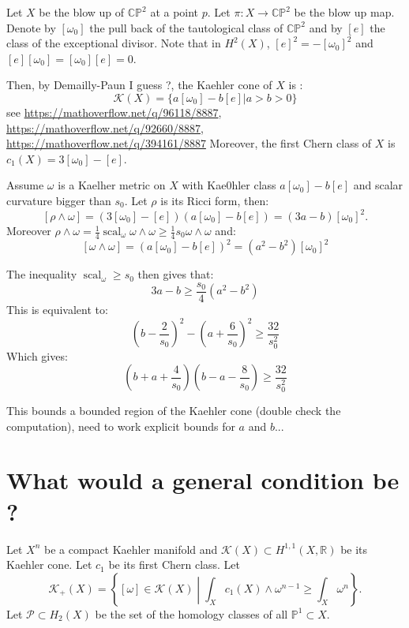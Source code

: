 \documentclass{amsart}
\numberwithin{equation}{section}
\theoremstyle {definition}
\DeclareMathOperator{\scal}{scal}
\begin{document}
Let $X$ be the blow up of $\mathbb{CP}^2$ at a point $p$. Let $\pi:X\to\mathbb{CP}^2$ be the blow up map. Denote by $[\omega_0]$ the pull back of the tautological class of $\mathbb{CP}^2$ and by $[e]$ the class of the exceptional divisor. Note that in $H^2(X)$, $[e]^2=-[\omega_0]^2$ and $[e][\omega_0]=[\omega_0][e]=0$.

Then, by Demailly-Paun I guess ?, the Kaehler cone of $X$ is :
\[\mathcal{K}(X)=\{a[\omega_0]-b[e]|a>b>0\}\]
see \url{https://mathoverflow.net/q/96118/8887}, \url{https://mathoverflow.net/q/92660/8887}, \url{https://mathoverflow.net/q/394161/8887}
Moreover, the first Chern class of $X$ is $c_1(X)=3[\omega_0]-[e]$.

Assume $\omega$ is a Kaelher metric on $X$ with Kae0hler class $a[\omega_0]-b[e]$ and scalar curvature bigger than $s_0$. Let $\rho$ is its Ricci form, then:
\[[\rho\wedge\omega]=(3[\omega_0]-[e])(a[\omega_0]-b[e])=(3a-b)[\omega_0]^2.\]
Moreover $\rho\wedge\omega=\tfrac{1}{4}\scal_\omega \omega\wedge\omega\geq\tfrac{1}{4} s_0\omega\wedge\omega$ and:
\[[\omega\wedge\omega]=(a[\omega_0]-b[e])^2=(a^2-b^2)[\omega_0]^2\]

The inequality $\scal_\omega\geq s_0$ then gives that:
\[3a-b\geq \frac{s_0}{4}(a^2-b^2)\]
This is equivalent to:
\[\left(b-\frac{2}{s_0}\right)^2-\left(a+\frac{6}{s_0}\right)^2\geq \frac{32}{s_0^2}\]
Which gives:
\[\left(b+a+\frac{4}{s_0}\right)\left(b-a-\frac{8}{s_0}\right)\geq\frac{32}{s_0^2} \]

This bounds a bounded region of the Kaehler cone (double check the computation), need to work explicit bounds for $a$ and $b$...

\section{What would a general condition be ?}

Let $X^n$ be a compact Kaehler manifold and $\mathcal{K}(X)\subset H^{1,1}(X,\mathbb{R})$ be its Kaehler cone. Let $c_1$ be its first Chern class. Let \[\mathcal{K}_+(X)=\left\{[\omega]\in\mathcal{K}(X)\middle|\int_X c_1(X)\wedge \omega^{n-1}\geq \int_X\omega^n\right\}.\]
Let $\mathcal{P}\subset H_2(X)$ be the set of the homology classes of  all $\mathbb{P}^1 \subset X$.
\end{document}
